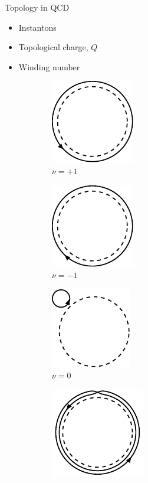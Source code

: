 \documentclass[10pt,show notes on second screen]{beamer}
\begin{document}
\begin{frame}{Topology in QCD}
\begin{itemize}
    \item Instantons
    \item Topological charge, $Q$
    \item Winding number
\end{itemize}

\begin{figure}[h!tb]
    \centering
    \begin{subfigure}{0.22\textwidth}
        \centering
        \includegraphics{../figures/illustrations/qcd/winding-number/winding-number1.pdf}
        \caption{$\nu=+1$}
    \end{subfigure}
    \begin{subfigure}{0.22\textwidth}
        \centering
        \includegraphics{../figures/illustrations/qcd/winding-number/winding-number-1.pdf}
        \caption{$\nu=-1$}
    \end{subfigure}
    \begin{subfigure}{0.22\textwidth}
        \centering
        \includegraphics{../figures/illustrations/qcd/winding-number/winding-number0.pdf}
        \caption{$\nu=0$}
    \end{subfigure}
    \begin{subfigure}{0.22\textwidth}
        \centering
        \includegraphics{../figures/illustrations/qcd/winding-number/winding-number+2.pdf}

\end{subfigure}
\end{figure}
\end{frame}
\end{document}
